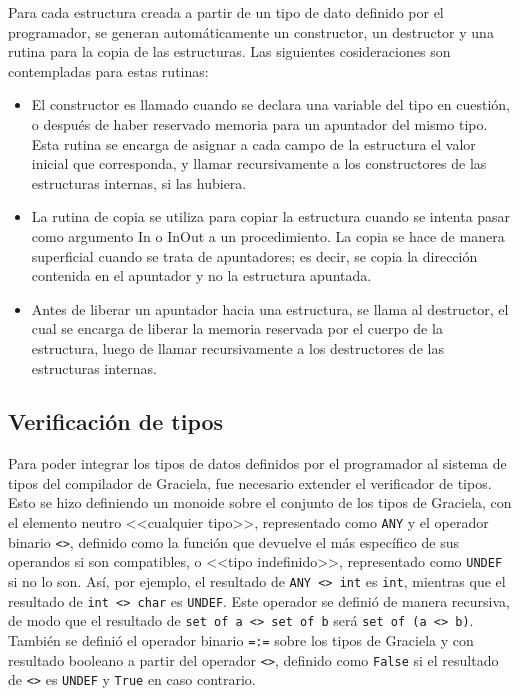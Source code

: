 {{Para cada estructura creada a partir de un tipo de dato definido por el programador,
se generan automáticamente un constructor, un destructor y una rutina para la
copia de las estructuras. Las siguientes cosideraciones son contempladas para
estas rutinas:

\begin{itemize}

  \item El constructor es llamado cuando se declara una variable del tipo en
  cuestión, o después de haber reservado memoria para un apuntador del mismo
  tipo. Esta rutina se encarga de asignar a cada campo de la estructura el valor
  inicial que corresponda, y llamar recursivamente a los constructores de las
  estructuras internas, si las hubiera.

  \item La rutina de copia se utiliza para copiar la estructura cuando se
  intenta pasar como argumento In o InOut a un procedimiento. La copia se hace
  de manera superficial cuando se trata de apuntadores; es decir, se copia la
  dirección contenida en el apuntador y no la estructura apuntada.

  \item Antes de liberar un apuntador hacia una estructura, se llama al
  destructor, el cual se encarga de liberar la memoria reservada por el cuerpo
  de la estructura, luego de llamar recursivamente a los destructores de las
  estructuras internas.

\end{itemize}


\subsection{Verificación de tipos}

Para poder integrar los tipos de datos definidos por el programador al sistema
de tipos del compilador de Graciela, fue necesario extender el verificador de
tipos. Esto se hizo definiendo un monoide sobre el conjunto de los tipos de
Graciela, con el elemento neutro <<cualquier tipo>>, representado como
\texttt{ANY} y el operador binario \texttt{<>}, definido como la función que
devuelve el más específico de sus operandos si son compatibles, o <<tipo
indefinido>>, representado como \texttt{UNDEF} si no lo son. Así, por ejemplo,
el resultado de \texttt{ANY <>{} int} es \texttt{int}, mientras que el resultado
de \texttt{int <>{} char} es \texttt{UNDEF}. Este operador se definió de manera
recursiva, de modo que el resultado de \texttt{set of a <>{} set of b} será
\texttt{set of (a <>{} b)}. También se definió el operador binario \texttt{=:=}
sobre los tipos de Graciela y con resultado booleano a partir del operador
\texttt{<>}, definido como \texttt{False} si el resultado de \texttt{<>} es
\texttt{UNDEF} y \texttt{True} en caso contrario.

}}
